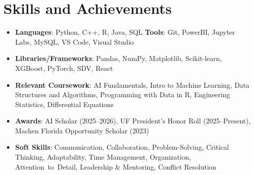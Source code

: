 \documentclass[letterpaper,9.7pt]{article}
\newcommand{\resumeSubHeadingListStart}{\begin{itemize}[leftmargin=0pt,label={},itemsep=2pt]}
\newcommand{\resumeSubHeadingListEnd}{\end{itemize}}
\begin{document}
\section{\textbf{Skills and Achievements}}
\resumeSubHeadingListStart
  \item{\textbf{Languages}: Python, C++, R, Java, SQL \textbf{Tools}: Git, PowerBI, Jupyter Labs, MySQL, VS Code, Visual Studio}
  \item{\textbf{Libraries/Frameworks}: Pandas, NumPy, Matplotlib, Scikit-learn, XGBoost, PyTorch, SDV, React}
  \item{\textbf{Relevant Coursework}: AI Fundamentals, Intro to Machine Learning, Data Structures and Algorithms, Programming with Data in R, Engineering Statistics, Differential Equations}
  \item{\textbf{Awards}: AI Scholar (2025--2026), UF President’s Honor Roll (2025--Present), Machen Florida Opportunity Scholar (2023)}
  \item{\textbf{Soft Skills}: Communication, Collaboration, Problem-Solving, Critical Thinking, Adaptability, Time Management, Organization, \mbox{Attention to Detail}, Leadership \& Mentoring, Conflict Resolution}
\resumeSubHeadingListEnd
\end{document}
